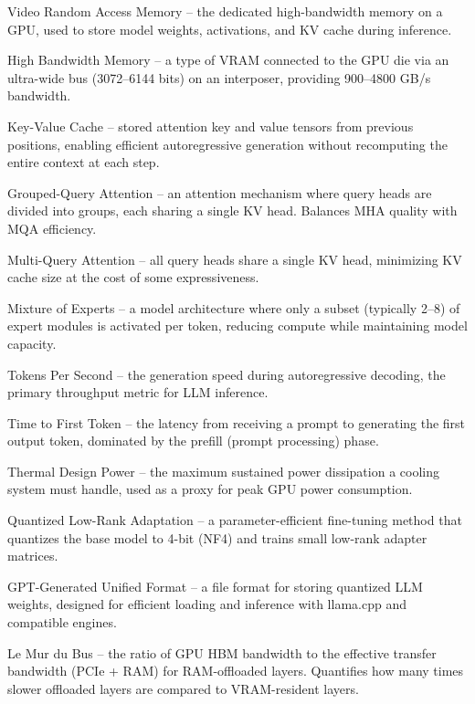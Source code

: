 \documentclass[11pt,a4paper]{article}
\theoremstyle{definition}
\begin{document}
\begin{description}[style=nextline]
  \item[VRAM] Video Random Access Memory -- the dedicated high-bandwidth memory on a GPU, used to store model weights, activations, and KV cache during inference.
  \item[HBM] High Bandwidth Memory -- a type of VRAM connected to the GPU die via an ultra-wide bus (3072--6144 bits) on an interposer, providing 900--4800 GB/s bandwidth.
  \item[KV Cache] Key-Value Cache -- stored attention key and value tensors from previous positions, enabling efficient autoregressive generation without recomputing the entire context at each step.
  \item[GQA] Grouped-Query Attention -- an attention mechanism where query heads are divided into groups, each sharing a single KV head. Balances MHA quality with MQA efficiency.
  \item[MQA] Multi-Query Attention -- all query heads share a single KV head, minimizing KV cache size at the cost of some expressiveness.
  \item[MoE] Mixture of Experts -- a model architecture where only a subset (typically 2--8) of expert modules is activated per token, reducing compute while maintaining model capacity.
  \item[TPS] Tokens Per Second -- the generation speed during autoregressive decoding, the primary throughput metric for LLM inference.
  \item[TTFT] Time to First Token -- the latency from receiving a prompt to generating the first output token, dominated by the prefill (prompt processing) phase.
  \item[TDP] Thermal Design Power -- the maximum sustained power dissipation a cooling system must handle, used as a proxy for peak GPU power consumption.
  \item[QLoRA] Quantized Low-Rank Adaptation -- a parameter-efficient fine-tuning method that quantizes the base model to 4-bit (NF4) and trains small low-rank adapter matrices.
  \item[GGUF] GPT-Generated Unified Format -- a file format for storing quantized LLM weights, designed for efficient loading and inference with llama.cpp and compatible engines.
  \item[Bus Wall] Le Mur du Bus -- the ratio of GPU HBM bandwidth to the effective transfer bandwidth (PCIe + RAM) for RAM-offloaded layers. Quantifies how many times slower offloaded layers are compared to VRAM-resident layers.

\end{description}
\end{document}
